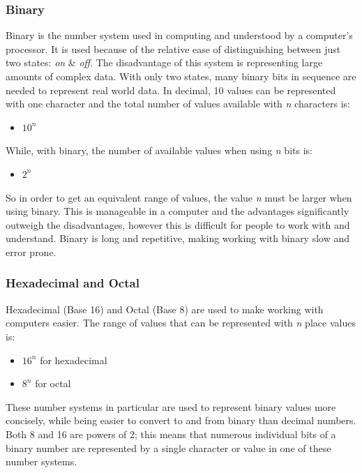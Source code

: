 \documentclass[9pt]{article}
\begin{document}
\subsubsection{Binary}
\label{sec:orgc600c8f}

Binary is the number system used in computing and understood by a computer's processor. It is used because of the relative ease of distinguishing between just two states: \emph{on} \& \emph{off}. The disadvantage of this system is representing large amounts of complex data. With only two states, many binary bits in sequence are needed to represent real world data. In decimal, 10 values can be represented with one character and the total number of values available with \emph{n} characters is:

\begin{itemize}
\item \(10^{n}\)
\end{itemize}

While, with binary, the number of available values when using \emph{n} bits is:

\begin{itemize}
\item \(2^{n}\)
\end{itemize}

So in order to get an equivalent range of values, the value \emph{n} must be larger when using binary. This is manageable in a computer and the advantages significantly outweigh the disadvantages, however this is difficult for people to work with and understand. Binary is long and repetitive, making working with binary slow and error prone.

\subsubsection{Hexadecimal and Octal}
\label{sec:orgc893782}

Hexadecimal (Base 16) and Octal (Base 8) are used to make working with computers easier. The range of values that can be represented with \emph{n} place values is:

\begin{itemize}
\item \(16^{n}\) for hexadecimal
\item \(8^n\) for octal
\end{itemize}

These number systems in particular are used to represent binary values more concisely, while being easier to convert to and from binary than decimal numbers. Both 8 and 16 are powers of 2; this means that numerous individual bits of a binary number are represented by a single character or value in one of these number systems.
\end{document}
